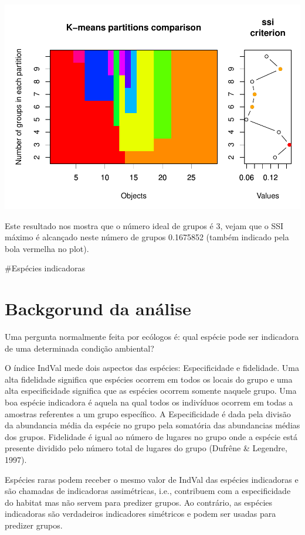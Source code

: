 \documentclass[
]{book}
\begin{document}
\includegraphics{livro_r_ecologia_files/figure-latex/unnamed-chunk-35-1.pdf}

Este resultado nos mostra que o número ideal de grupos é 3, vejam que o SSI máximo é alcançado neste número de grupos 0.1675852 (também indicado pela bola vermelha no plot).

\#Espécies indicadoras

\hypertarget{backgorund-da-anuxe1lise-2}{%
\section{Backgorund da análise}\label{backgorund-da-anuxe1lise-2}}

Uma pergunta normalmente feita por ecólogos é: qual espécie pode ser indicadora de uma determinada condição ambiental?

O índice IndVal mede dois aspectos das espécies: Especificidade e fidelidade. Uma alta fidelidade significa que espécies ocorrem em todos os locais do grupo e uma alta especificidade significa que as espécies ocorrem somente naquele grupo. Uma boa espécie indicadora é aquela na qual todos os indivíduos ocorrem em todas a amostras referentes a um grupo específico.
A Especificidade é dada pela divisão da abundancia média da espécie no grupo pela somatória das abundancias médias dos grupos. Fidelidade é igual ao número de lugares no grupo onde a espécie está presente dividido pelo número total de lugares do grupo (Dufrêne \& Legendre, 1997).

Espécies raras podem receber o mesmo valor de IndVal das espécies indicadoras e são chamadas de indicadoras assimétricas, i.e., contribuem com a especificidade do habitat mas não servem para predizer grupos. Ao contrário, as espécies indicadoras são verdadeiros indicadores simétricos e podem ser usadas para predizer grupos.
\end{document}
